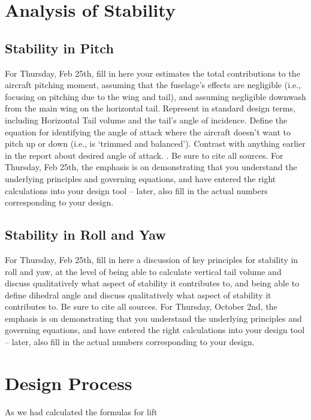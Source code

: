 \documentclass{../aiaa-pretty}
\begin{document}
\section{Analysis of Stability}
\subsection{Stability in Pitch}

For Thursday, Feb 25th, fill in here your estimates the total contributions to the aircraft pitching moment, assuming that the fuselage’s effects are negligible (i.e., focusing on pitching due to the wing and tail), and assuming negligible downwash from the main wing on the horizontal tail.  Represent in standard design terms, including Horizontal Tail volume and the tail’s angle of incidence.  Define the equation for identifying the angle of attack where the aircraft doesn’t want to pitch up or down (i.e., is ‘trimmed and balanced’).  Contrast with anything earlier in the report about desired angle of attack.  .  Be sure to cite all sources.  For Thursday, Feb 25th, the emphasis is on demonstrating that you understand the underlying principles and governing equations, and have entered the right calculations into your design tool – later, also fill in the actual numbers corresponding to your design.

\subsection{Stability in Roll and Yaw}

For Thursday, Feb 25th, fill in here a discussion of key principles for stability in roll and yaw, at the level of being able to calculate vertical tail volume and discuss qualitatively what aspect of stability it contributes to, and being able to define dihedral angle and discuss qualitatively what aspect of stability it contributes to.  Be sure to cite all sources.  For Thursday, October 2nd, the emphasis is on demonstrating that you understand the underlying principles and governing equations, and have entered the right calculations into your design tool – later, also fill in the actual numbers corresponding to your design.

\section{Design Process}

As we had calculated the formulas for lift
\end{document}
